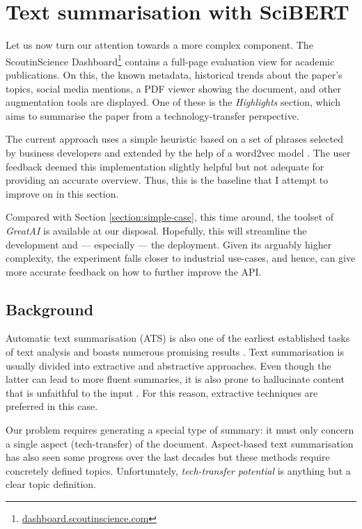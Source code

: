 \section{Text summarisation with SciBERT} \label{section:complex-case}

Let us now turn our attention towards a more complex component. The ScoutinScience Dashboard\footnote{\href{https://dashboard.scoutinscience.com/}{dashboard.scoutinscience.com}} contains a full-page evaluation view for academic publications. On this, the known metadata, historical trends about the paper's topics, social media mentions, a PDF viewer showing the document, and other augmentation tools are displayed. One of these is the \textit{Highlights} section, which aims to summarise the paper from a technology-transfer perspective.

The current approach uses a simple heuristic based on a set of phrases selected by business developers and extended by the help of a word2vec model \cite{mikolov2013efficient}. The user feedback deemed this implementation slightly helpful but not adequate for providing an accurate overview. Thus, this is the baseline that I attempt to improve on in this section.

\begin{displayquote}
Compared with Section \ref{section:simple-case}, this time around, the toolset of \textit{GreatAI} is available at our disposal. Hopefully, this will streamline the development and --- especially --- the deployment. Given its arguably higher complexity, the experiment falls closer to industrial use-cases, and hence, can give more accurate feedback on how to further improve the API.
\end{displayquote}

\subsection{Background}

Automatic text summarisation (ATS) is also one of the earliest established tasks of text analysis and boasts numerous promising results \cite{el2021automatic}. Text summarisation is usually divided into extractive and abstractive approaches. Even though the latter can lead to more fluent summaries, it is also prone to hallucinate content that is unfaithful to the input \cite{maynez2020faithfulness}. For this reason, extractive techniques are preferred in this case.

Our problem requires generating a special type of summary: it must only concern a single aspect (tech-transfer) of the document. Aspect-based text summarisation has also seen some progress over the last decades \cite{berkovsky2008aspect,hayashi2021wikiasp} but these methods require concretely defined topics. Unfortunately, \textit{tech-transfer potential} is anything but a clear topic definition.


